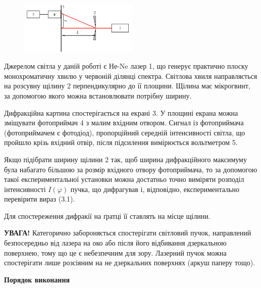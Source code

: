 \documentclass[12pt,a4paper]{article}
\begin{document}
    \begin{figure}[!ht]

        \renewcommand{\thefigure}{3.\arabic{figure}} %

        \centering
        \includegraphics[width=0.5\textwidth]{3.4.png}
        \caption{}
        \label{fig4:schema}

    \end{figure}

    Джерелом світла у
    даній роботі є Не-Ne лазер 1, що генерує практично плоску монохроматичну
    хвилю у червоній ділянці спектра. Світлова хвиля направляється на розсувну
    щілину 2 перпендикулярно до її площини. Щілина має мікрогвинт, за допомогою
    якого можна встановлювати потрібну ширину.

    Дифракційна картина спостерігається на екрані 3. У площині екрана можна
    зміщувати фотоприймач 4 з малим вхідним отвором. Сигнал із фотоприймача
    (фотоприймачем є фотодіод), пропорційний середній інтенсивності світла, що
    пройшло крізь вхідний отвір, після підсилення вимірюється вольтметром 5.

    Якщо підібрати ширину щілини 2 так, щоб ширина дифракційного
    максимуму була набагато більшою за розмір вхідного отвору фотоприймача, то за
    допомогою такої експериментальної установки можна достатньо точно виміряти
    розподіл інтенсивності $I(\varphi)$ пучка, що дифрагував і, відповідно, експериментально
    перевірити вираз (3.1).

    Для спостереження дифракії на ґратці її ставлять на місце щілини.

    \textbf{УВАГА!} Категорично забороняється спостерігати світловий пучок, направлений
    безпосередньо від лазера на око або після його відбивання дзеркальною
    поверхнею, тому що це є небезпечним для зору. Лазерний пучок можна
    спостерігати лише розсіяним на не дзеркальних поверхнях (аркуш паперу тощо).

    \begin{center} \textbf{Порядок виконання} \end{center}
\end{document}
